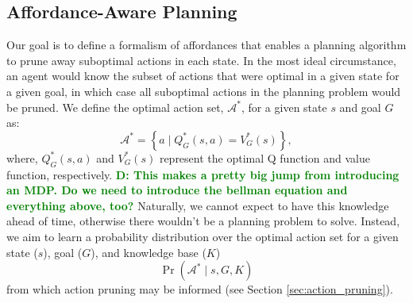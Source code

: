 \documentclass[conference]{IEEEtran}
\newcommand{\dnote}[1]{\textcolor{Green}{\textbf{D: #1}}}
\begin{document}


\subsection{Affordance-Aware Planning}


Our goal is to define a formalism of affordances that enables a planning algorithm
to prune away suboptimal actions in each state. In the most ideal circumstance, an agent would
know the subset of actions that were optimal in a given state for a given goal, in 
which case all suboptimal actions in the planning problem would be pruned. 
We define the optimal action set, $\mathcal{A}^*$, for a given state $s$ and goal $G$ as:
\begin{equation}
\mathcal{A}^* = \left\{ a \mid Q^*_G(s,a) = V^*_G(s) \right\}, 
\label{eq:opt_act_set}
\end{equation}
where, $Q^*_G(s,a)$ and $V^*_G(s)$ represent the optimal Q function and 
value function, respectively. 
\dnote{This makes a pretty big jump from introducing an MDP. Do we need to introduce
the bellman equation and everything above, too?}
Naturally, we cannot expect to have this knowledge ahead of time, otherwise there wouldn't be a planning problem to solve. Instead, we aim to learn a probability distribution over the optimal action set for a given state ($s$), goal ($G$), and knowledge base ($K$)
\begin{equation}
\Pr(\mathcal{A}^* \mid s, G, K)
\label{eq:master}
\end{equation}
from which action pruning may be informed (see Section \ref{sec:action_pruning}).
\end{document}
